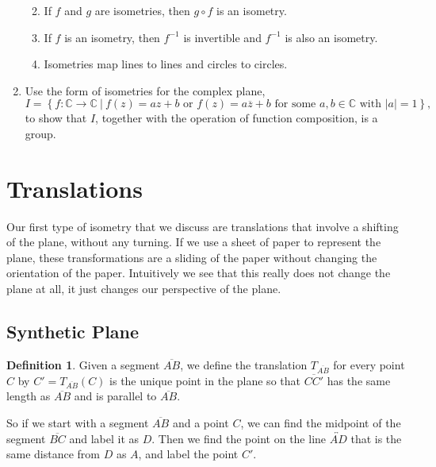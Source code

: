 \documentclass[
]{book}
\providecommand{\tightlist}{%
  \setlength{\itemsep}{0pt}\setlength{\parskip}{0pt}}
\theoremstyle{definition}
\newtheorem{definition}{Definition}[chapter]
\theoremstyle{definition}
\theoremstyle{definition}
\theoremstyle{definition}
\theoremstyle{remark}
\begin{document}
\begin{enumerate}
  \begin{enumerate}
  \def\labelenumii{\alph{enumii}.}
  \tightlist
  \item
    If \(f\) and \(g\) are isometries, then \(g\circ f\) is an isometry.
  \item
    If \(f\) is an isometry, then \(f^{-1}\) is invertible and \(f^{-1}\) is also an isometry.
  \item
    Isometries map lines to lines and circles to circles.
  \end{enumerate}
\item
  Use the form of isometries for the complex plane, \[I = \left\{ f: \mathbb{C} \rightarrow \mathbb{C} \:\vert \: f(z)=a z+b \mbox{ or } f(z)=a \overline{z}+b \mbox{ for some } a, b \in \mathbb{C} \mbox{ with } |a|=1 \right\},\] to show that \(I\), together with the operation of function composition, is a group.
\end{enumerate}

\hypertarget{translations}{%
\section{Translations}\label{translations}}

Our first type of isometry that we discuss are translations that involve a shifting of the plane, without any turning. If we use a sheet of paper to represent the plane, these transformations are a sliding of the paper without changing the orientation of the paper. Intuitively we see that this really does not change the plane at all, it just changes our perspective of the plane.

\hypertarget{synthetic-plane-1}{%
\subsection{Synthetic Plane}\label{synthetic-plane-1}}

\begin{definition}
Given a segment \(\overline{AB}\), we define the translation \(T_{\overline{AB}}\) for every point \(C\) by \(C'=T_{\overline{AB}}(C)\) is the unique point in the plane so that \(\overline{CC'}\) has the same length as \(\overline{AB}\) and is parallel to \(\overline{AB}\).
\end{definition}

So if we start with a segment \(\overline{AB}\) and a point \(C\), we can find the midpoint of the segment \(\overline{BC}\) and label it as \(D\). Then we find the point on the line \(\overleftrightarrow{AD}\) that is the same distance from \(D\) as \(A\), and label the point \(C'\).
\end{document}
